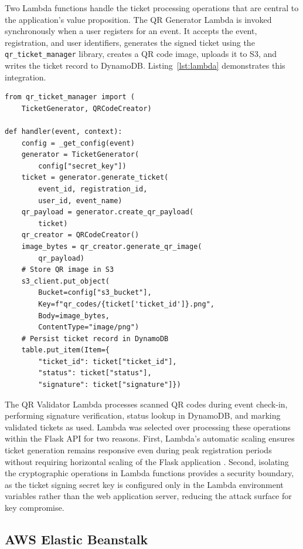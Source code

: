 \documentclass[conference]{IEEEtran}
\begin{document}
Two Lambda functions handle the ticket processing operations that are central to the application's value proposition. The QR Generator Lambda is invoked synchronously when a user registers for an event. It accepts the event, registration, and user identifiers, generates the signed ticket using the \texttt{qr\_ticket\_manager} library, creates a QR code image, uploads it to S3, and writes the ticket record to DynamoDB. Listing~\ref{lst:lambda} demonstrates this integration.

\begin{lstlisting}[caption={Lambda QR Generator using the custom library.}, label={lst:lambda}]
from qr_ticket_manager import (
    TicketGenerator, QRCodeCreator)

def handler(event, context):
    config = _get_config(event)
    generator = TicketGenerator(
        config["secret_key"])
    ticket = generator.generate_ticket(
        event_id, registration_id,
        user_id, event_name)
    qr_payload = generator.create_qr_payload(
        ticket)
    qr_creator = QRCodeCreator()
    image_bytes = qr_creator.generate_qr_image(
        qr_payload)
    # Store QR image in S3
    s3_client.put_object(
        Bucket=config["s3_bucket"],
        Key=f"qr_codes/{ticket['ticket_id']}.png",
        Body=image_bytes,
        ContentType="image/png")
    # Persist ticket record in DynamoDB
    table.put_item(Item={
        "ticket_id": ticket["ticket_id"],
        "status": ticket["status"],
        "signature": ticket["signature"]})
\end{lstlisting}

The QR Validator Lambda processes scanned QR codes during event check-in, performing signature verification, status lookup in DynamoDB, and marking validated tickets as used. Lambda was selected over processing these operations within the Flask API for two reasons. First, Lambda's automatic scaling ensures ticket generation remains responsive even during peak registration periods without requiring horizontal scaling of the Flask application \cite{awslambda2024}. Second, isolating the cryptographic operations in Lambda functions provides a security boundary, as the ticket signing secret key is configured only in the Lambda environment variables rather than the web application server, reducing the attack surface for key compromise.

\subsection{AWS Elastic Beanstalk}
\end{document}
